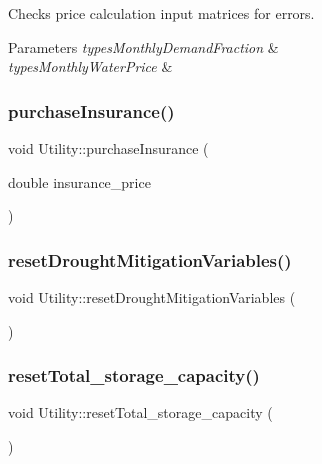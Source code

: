 Checks price calculation input matrices for errors. 
\begin{DoxyParams}{Parameters}
{\em types\+Monthly\+Demand\+Fraction} & \\
\hline
{\em types\+Monthly\+Water\+Price} & \\
\hline
\end{DoxyParams}
\mbox{\label{classUtility_a97073e3d7a30275c639484b3158284fa}} 
\subsubsection{\texorpdfstring{purchase\+Insurance()}{purchaseInsurance()}}
{\footnotesize\ttfamily void Utility\+::purchase\+Insurance (\begin{DoxyParamCaption}\item[{double}]{insurance\+\_\+price }\end{DoxyParamCaption})}

\mbox{\label{classUtility_af9ec9c2cb69166db021f03ce9ddf4d8e}} 
\subsubsection{\texorpdfstring{reset\+Drought\+Mitigation\+Variables()}{resetDroughtMitigationVariables()}}
{\footnotesize\ttfamily void Utility\+::reset\+Drought\+Mitigation\+Variables (\begin{DoxyParamCaption}{ }\end{DoxyParamCaption})}

\mbox{\label{classUtility_a0ac180e13fb963a29c2860664c3f352a}} 
\subsubsection{\texorpdfstring{reset\+Total\+\_\+storage\+\_\+capacity()}{resetTotal\_storage\_capacity()}}
{\footnotesize\ttfamily void Utility\+::reset\+Total\+\_\+storage\+\_\+capacity (\begin{DoxyParamCaption}{ }\end{DoxyParamCaption})}

